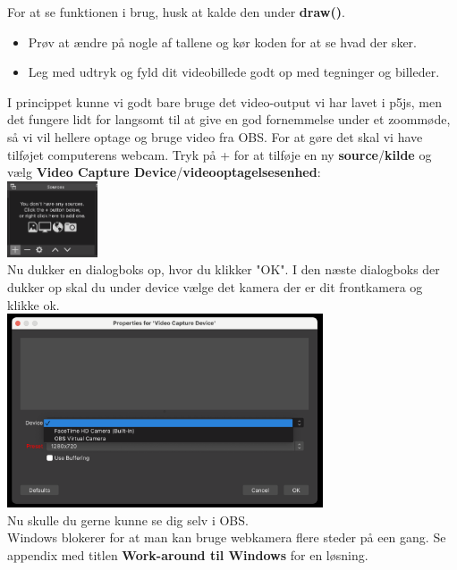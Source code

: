 \documentclass{ucph-handout}
\begin{document}
\begin{exercisebox}[adjusted title=En funktion der tegner med lyd]
For at se funktionen i brug, husk at kalde den under \textbf{draw()}.

\vspace{3mm}

\begin{itemize}
    \item Prøv at ændre på nogle af tallene og kør koden for at se hvad der sker. 
    \item Leg med udtryk og fyld dit videobillede godt op med tegninger og billeder. 
\end{itemize}

\vspace{3mm}
\end{exercisebox}


\begin{exercisebox}[adjusted title= Optimer koden på mac.]

I princippet kunne vi godt bare bruge det video-output vi har lavet i p5js, men det fungere lidt for langsomt til at give en god fornemmelse under et zoommøde, så vi vil hellere optage og bruge video fra OBS. For at gøre det skal vi have tilføjet computerens webcam. Tryk på + for at tilføje en ny \textbf{source}/\textbf{kilde} og vælg \textbf{Video Capture Device}/\textbf{videooptagelsesenhed}: \\

\includegraphics[width=0.2\textwidth]{billeder/OBSsourse.png}\\

Nu dukker en dialogboks op, hvor du klikker "OK". I den næste dialogboks der dukker op skal du under device vælge det kamera der er dit frontkamera og klikke ok. \\

\includegraphics[width=0.7\textwidth]{billeder/velgdevise.png}\\

Nu skulle du gerne kunne se dig selv i OBS. \\
\vspace{3mm}
Windows blokerer for at man kan bruge webkamera flere steder på een gang. Se appendix med titlen \textbf{Work-around til Windows} for en løsning. 
\vspace{3mm}
\end{exercisebox}
\end{document}
